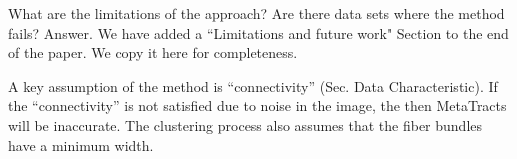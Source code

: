 \documentclass[]{article}
\begin{document}
\color{red}

What are the limitations of the approach? Are there data sets where the
method fails?
\color{black}
Answer. We have added a ``Limitations and future work" Section to the end of the paper. We copy it here for completeness.


 A key assumption of the method is ``connectivity'' (Sec. Data Characteristic).
 If the ``connectivity'' is not satisfied due to noise in the image, the then MetaTracts will be inaccurate. 
 The clustering process also assumes that the fiber bundles have a minimum width. 


\end{document}
